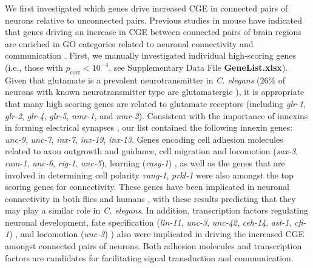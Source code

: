 \documentclass[10pt,letterpaper]{article}
\begin{document}
{We first investigated which genes drive increased CGE in connected pairs of neurons relative to unconnected pairs.
Previous studies in mouse have indicated that genes driving an increase in CGE between connected pairs of brain regions are enriched in GO categories related to neuronal connectivity and communication \cite{Fulcher:2016ck, Ji:2014jw, Fakhry:2015kl, French:2011cz}.
First, we manually investigated individual high-scoring genes (i.e., those with $p_\mathrm{corr} < 10^{-4}$, see Supplementary Data File \textbf{GeneList.xlsx}).
Given that glutamate is a prevalent neurotransmitter in \textit{C. elegans} (26\% of neurons with known neurotransmitter type are glutamatergic \cite{Pereira:2015er}), it is appropriate that many high scoring genes are related to glutamate receptors (including \emph{glr-1}, \emph{glr-2}, \emph{glr-4}, \emph{glr-5}, \emph{nmr-1}, and \emph{nmr-2}).
Consistent with the importance of innexins in forming electrical synapses \cite{Starich2001}, our list contained the following innexin genes: \emph{unc-9}, \emph{unc-7}, \emph{inx-7}, \emph{inx-19}, \emph{inx-13}.
Genes encoding cell adhesion molecules related to axon outgrowth and guidance, cell migration and locomotion (\emph{sax-3}, \emph{cam-1}, \emph{unc-6}, \emph{rig-1}, \emph{unc-5}), learning (\emph{casy-1}) \cite{Zallen1999, Garriga1999, Leung-Hagesteijn1992, Harris:2009kd, Ikeda2008},
as well as the genes that are involved in determining cell polarity \emph{vang-1}, \emph{prkl-1} \cite{Wu2006, Hoffmann2010} were also amongst the top scoring genes for connectivity.
These genes have been implicated in neuronal connectivity in both flies and humans \cite{Paemka2013, Ehaideb2016, Sowers2013}, with these results predicting that they may play a similar role in \textit{C. elegans}.
In addition, transcription factors regulating neuronal development,
fate specification (\emph{lin-11}, \emph{unc-3}, \emph{unc-42}, \emph{ceh-14}, \emph{ast-1}, \emph{cfi-1}) \cite{Sarafi-Reinach2001, Prasad2008, Baran1999, Cassata2000, Schmid2006, Shaham2002a},
and locomotion (\emph{unc-3}) \cite{Prasad2008}) also were implicated in driving the increased CGE amongst connected pairs of neurons.
Both adhesion molecules and transcription factors are candidates for facilitating signal transduction and communication.

}
\end{document}
